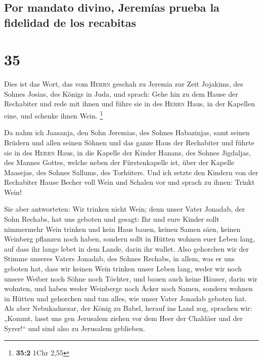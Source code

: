 \hypertarget{por-mandato-divino-jeremuxedas-prueba-la-fidelidad-de-los-recabitas}{%
\subsection{Por mandato divino, Jeremías prueba la fidelidad de los
recabitas}\label{por-mandato-divino-jeremuxedas-prueba-la-fidelidad-de-los-recabitas}}

\hypertarget{section-34}{%
\section{35}\label{section-34}}

 Dies ist das Wort, das vom \textsc{Herrn} geschah zu
Jeremia zur Zeit Jojakims, des Sohnes Josias, des Königs in Juda, und
sprach:  Gehe hin zu dem Hause der Rechabiter und rede mit
ihnen und führe sie in des \textsc{Herrn} Haus, in der Kapellen eine,
und schenke ihnen Wein. \footnote{\textbf{35:2} 1Chr 2,55}

 Da nahm ich Jaasanja, den Sohn Jeremias, des Sohnes
Habazinjas, samt seinen Brüdern und allen seinen Söhnen und das ganze
Haus der Rechabiter  und führte sie in des \textsc{Herrn}
Haus, in die Kapelle der Kinder Hanans, des Sohnes Jigdaljas, des Mannes
Gottes, welche neben der Fürstenkapelle ist, über der Kapelle Maasejas,
des Sohnes Sallums, des Torhüters.  Und ich setzte den
Kindern von der Rechabiter Hause Becher voll Wein und Schalen vor und
sprach zu ihnen: Trinkt Wein!

 Sie aber antworteten: Wir trinken nicht Wein; denn unser
Vater Jonadab, der Sohn Rechabs, hat uns geboten und gesagt: Ihr und
eure Kinder sollt nimmermehr Wein trinken  und kein Haus
bauen, keinen Samen säen, keinen Weinberg pflanzen noch haben, sondern
sollt in Hütten wohnen euer Leben lang, auf dass ihr lange lebet in dem
Lande, darin ihr wallet.  Also gehorchen wir der Stimme
unseres Vaters Jonadab, des Sohnes Rechabs, in allem, was er uns geboten
hat, dass wir keinen Wein trinken unser Leben lang, weder wir noch
unsere Weiber noch Söhne noch Töchter,  und bauen auch
keine Häuser, darin wir wohnten, und haben weder Weinberge noch Äcker
noch Samen,  sondern wohnen in Hütten und gehorchen und
tun alles, wie unser Vater Jonadab geboten hat.  Als aber
Nebukadnezar, der König zu Babel, herauf ins Land zog, sprachen wir:
„Kommt, lasst uns gen Jerusalem ziehen vor dem Heer der Chaldäer und der
Syrer!{}`` und sind also zu Jerusalem geblieben.

